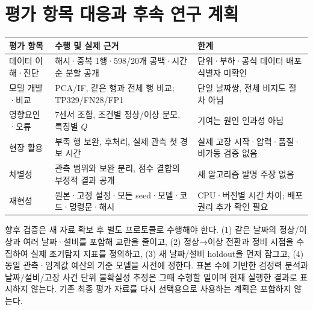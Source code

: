 \documentclass{article}
\begin{document}
\section{평가 항목 대응과 후속 연구 계획}
\begin{table}[h]\centering\small
\begin{tabularx}{\textwidth}{lXX}\toprule
평가 항목 & 수행 및 실제 근거 & 한계\\\midrule
데이터 이해·진단 & 해시·중복 1행·598/20개 공백·시간순 분할 공개 & 단위·부하·공식 데이터 배포 식별자 미확인\\
모델 개발·비교 & PCA/IF, 같은 행과 전체 행 비교; TP329/FN28/FP1 & 단일 날짜쌍, 전체 비지도 절차 아님\\
영향요인·오류 & 7센서 조합, 조건별 정상/이상 분모, 특징별 $Q$ & 기여는 원인 인과성 아님\\
현장 활용 & 부족 행 보완, 후처리, 실제 관측 첫 경보 시간 & 실제 고장 시작·압력·품질·비가동 검증 없음\\
차별성 & 관측 범위와 보완 분리, 점수 결합의 부정적 결과 공개 & 새 알고리즘 발명 주장 없음\\
재현성 & 원본·고정 설정·모든 seed·모델·코드·명령문·해시 & CPU·버전별 시간 차이; 배포 권리 추가 확인 필요\\\bottomrule
\end{tabularx}
\end{table}

향후 검증은 새 자료 확보 후 별도 프로토콜로 수행해야 한다. (1) 같은 날짜의 정상/이상과 여러 날짜·설비를 포함해 교란을 줄이고, (2) 정상→이상 전환과 정비 시점을 수집하여 실제 조기탐지 지표를 정의하고, (3) 새 날짜/설비 holdout을 먼저 잠그고, (4) 동일 관측·임계값 예산의 기준 모델을 사전에 정한다. 표본 수에 기반한 검정력 분석과 날짜/설비/고장 사건 단위 불확실성 추정은 그때 수행할 일이며 현재 실행한 결과로 표시하지 않는다. 기존 최종 평가 자료를 다시 선택용으로 사용하는 계획은 포함하지 않는다.
\end{document}
